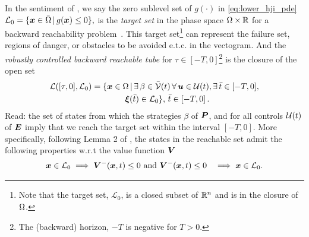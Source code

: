 In the sentiment of \cite{Mitchell2005}, we say the zero sublevel set of $g(\cdot)$ in \eqref{eq:lower_hji_pde} \ie $\mathcal{L}_0 = \{ \bm{x} \in \bar{\Omega} \,|\, g(\bm{x}) \le 0 \},$
%
%
is the \textit{target set} in the phase space $\Omega \times \mathbb{R}$ for a backward reachability problem~\cite{Mitchell2001}. %
This target set\footnote{Note that the target set, $\mathcal{L}_0$, is a closed subset of $\mathbb{R}^n$ and is in the closure of $\Omega$.} can represent the failure set, regions of danger, or obstacles to be avoided e.t.c. in the vectogram.  And the \textit{robustly controlled backward reachable tube} for $\tau \in [-T, 0]$\footnote{The (backward) horizon, $-T$ is negative for $T>0$.} is the closure of the open set
%
\begin{align}
	\mathcal{L}([\tau, 0], \mathcal{L}_0) &= \{\state \in \openset \,| \, \exists \, \beta \in \mathcal{\bar{V}}(t) \,  \forall \, \bm{u} \in \mathcal{U}(t), \exists \, \bar{t} \in [-T, 0], \nonumber \\
	& \qquad  \qquad \bm{\xi}(\bar{t})%
	\in  \mathcal{L}_0 \}, \,\bar{t} \in \left[-T, 0\right].
	\label{eq:rcbrt}
\end{align}
%
Read: the set of states from which the strategies $\beta$ of $\bm{P}$, and for all controls $\mathcal{U}(t)$ of $\bm{E}$ imply that we reach the target set within the interval $[-T, 0]$.   More specifically, following Lemma 2 of \cite{Mitchell2005}, the states in the reachable set admit the following properties w.r.t the value function $\bm{V}$
%
	\begin{align}
		\bm{x} \in \mathcal{L}_0 &\implies \bm{V}^-(\bm{x}, t) \le 0 \text{ and }		\bm{V}^-(\bm{x}, t) \le 0 &\implies \bm{x} \in \mathcal{L}_0.
		\label{eq:reachables}
	\end{align}
%
